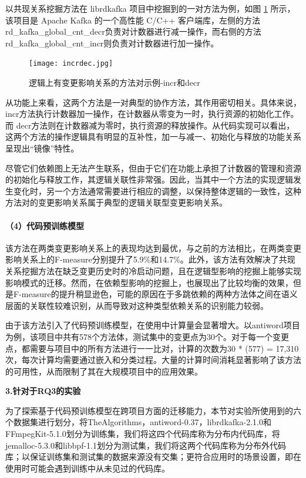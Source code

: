 以共现关系挖掘方法在 librdkafka 项目中挖掘到的一对方法为例，如图 \ref{1_逻辑上有变更影响关系的方法对示例-incr和decr} 所示，该项目是 Apache Kafka 的一个高性能 C/C++ 客户端库，左侧的方法rd\_kafka\_global\_cnt\_decr负责对计数器进行减一操作，而右侧的方法rd\_kafka\_global\_cnt\_incr则负责对计数器进行加一操作。

\begin{figure}[h]
\centering
\texttt{[image: incrdec.jpg]}
\caption{逻辑上有变更影响关系的方法对示例-incr和decr}
\label{1_逻辑上有变更影响关系的方法对示例-incr和decr}
\end{figure}

从功能上来看，这两个方法是一对典型的协作方法，其作用密切相关。具体来说，incr方法执行计数器加一操作，在计数器从零变为一时，执行资源的初始化工作。而 decr方法则在计数器减为零时，执行资源的释放操作。从代码实现可以看出，这两个方法的操作逻辑具有明显的互补性，加一与减一、初始化与释放的功能关系呈现出“镜像”特性。

尽管它们依赖图上无法产生联系，但由于它们在功能上承担了计数器的管理和资源的初始化与释放工作，其逻辑关联性非常强。因此，当其中一个方法的实现逻辑发生变化时，另一个方法通常需要进行相应的调整，以保持整体逻辑的一致性，这种方法对的变更影响关系属于典型的逻辑关联型变更影响关系。

\paragraph{（4）代码预训练模型}

该方法在两类变更影响关系上的表现均达到最优，与之前的方法相比，在两类变更影响关系上的F-measure分别提升了5.9\%和14.7\%。此外，该方法有效解决了共现关系挖掘方法在缺乏变更历史时的冷启动问题，且在逻辑型影响的挖掘上能够实现影响模式的迁移。然而，在依赖型影响的挖掘上，也展现出了比较均衡的效果，但是F-measure的提升稍显逊色，可能的原因在于多跳依赖的两种方法体之间在语义层面的关联性较难识别，从而导致对这种类型依赖关系的识别能力较弱。

由于该方法引入了代码预训练模型，在使用中计算量会显著增大。以antiword项目为例，该项目中共有578个方法体，测试集中的变更点为30个。对于每一个变更点，都需要与项目中的所有方法进行一一比对，计算的次数为30 * (577) = 17,310次，每次计算均需要通过嵌入和分类过程。大量的计算时间消耗显著影响了该方法的可用性，从而限制了其在大规模项目中的应用效果。
    

\textbf{3.针对于RQ3的实验}

为了探索基于代码预训练模型在跨项目方面的迁移能力，本节对实验所使用到的六个数据集进行划分，将TheAlgorithms，antiword-0.37，librdkafka-2.1.0和FFmpegKit-5.1.0划分为训练集，我们将这四个代码库称为分布内代码库，将jemalloc-5.3.0和libbpf-1.1划分为测试集，我们将这两个代码库称为分布外代码库；以保证训练集和测试集的数据来源没有交集；更符合应用时的场景设置，即在使用时可能会遇到训练中从未见过的代码库。


